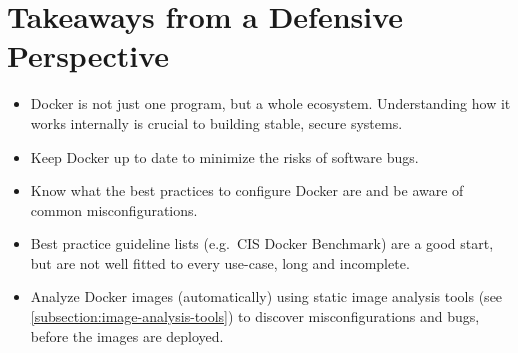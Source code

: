 \section{Takeaways from a Defensive Perspective}

\begin{itemize}
    \item Docker is not just one program, but a whole ecosystem. Understanding how it works internally is crucial to building stable, secure systems.

    \item Keep Docker up to date to minimize the risks of software bugs.

    \item Know what the best practices to configure Docker are and be aware of common misconfigurations.

    \item Best practice guideline lists (e.g.\ CIS Docker Benchmark) are a good start, but are not well fitted to every use-case, long and incomplete.

    \item Analyze Docker images (automatically) using static image analysis tools (see \autoref{subsection:image-analysis-tools}) to discover misconfigurations and bugs, before the images are deployed.
\end{itemize}
